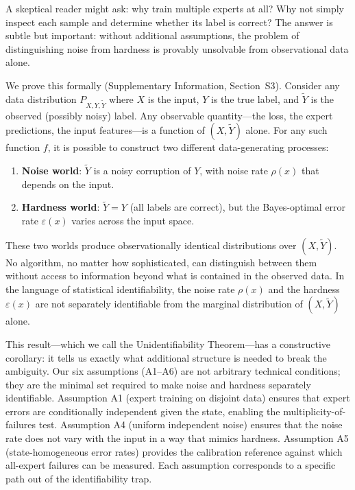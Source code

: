 A skeptical reader might ask: why train multiple experts at all? Why not simply inspect each sample and determine whether its label is correct? The answer is subtle but important: without additional assumptions, the problem of distinguishing noise from hardness is provably unsolvable from observational data alone.

We prove this formally (Supplementary Information, Section~S3). Consider any data distribution $P_{X,Y,\tilde{Y}}$ where $X$ is the input, $Y$ is the true label, and $\tilde{Y}$ is the observed (possibly noisy) label. Any observable quantity---the loss, the expert predictions, the input features---is a function of $(X, \tilde{Y})$ alone. For any such function $f$, it is possible to construct two different data-generating processes:

\begin{enumerate}
    \item \textbf{Noise world}: $\tilde{Y}$ is a noisy corruption of $Y$, with noise rate $\rho(x)$ that depends on the input.
    \item \textbf{Hardness world}: $\tilde{Y} = Y$ (all labels are correct), but the Bayes-optimal error rate $\varepsilon(x)$ varies across the input space.
\end{enumerate}

These two worlds produce observationally identical distributions over $(X, \tilde{Y})$. No algorithm, no matter how sophisticated, can distinguish between them without access to information beyond what is contained in the observed data. In the language of statistical identifiability, the noise rate $\rho(x)$ and the hardness $\varepsilon(x)$ are not separately identifiable from the marginal distribution of $(X, \tilde{Y})$ alone.

This result---which we call the Unidentifiability Theorem---has a constructive corollary: it tells us exactly what additional structure is needed to break the ambiguity. Our six assumptions (A1--A6) are not arbitrary technical conditions; they are the minimal set required to make noise and hardness separately identifiable. Assumption A1 (expert training on disjoint data) ensures that expert errors are conditionally independent given the state, enabling the multiplicity-of-failures test. Assumption A4 (uniform independent noise) ensures that the noise rate does not vary with the input in a way that mimics hardness. Assumption A5 (state-homogeneous error rates) provides the calibration reference against which all-expert failures can be measured. Each assumption corresponds to a specific path out of the identifiability trap.

